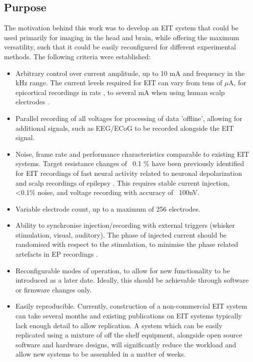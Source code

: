 \subsection{Purpose}

The motivation behind this work was to develop an EIT system that could be used primarily for imaging in the head and brain, while offering the maximum versatility, such that it could be easily reconfigured for different experimental methods. The following criteria were established:


\begin{itemize}
\item Arbitrary control over current amplitude, up to 10 mA and frequency in the kHz range. The current levels required for EIT can vary from tens of $\mu$A, for epicortical recordings in rats \cite{Oh2011}, to several mA when using human scalp electrodes \cite{tidswell2001three}.
\item Parallel recording of all voltages for processing of data 'offline', allowing for additional signals, such as EEG/ECoG to be recorded alongside the EIT signal.
\item Noise, frame rate and performance characteristics comparable to existing EIT systems. Target resistance changes of ~0.1 \% have been previously identified for EIT recordings of fast neural activity related to neuronal depolarization and scalp recordings of epilepsy \cite{Oh2011,Fabrizi_2006}. This requires stable current injection, <0.1\% noise, and voltage recording with accuracy of ~100nV.
\item Variable electrode count, up to a maximum of 256 electrodes.
\item Ability to synchronise injection/recording with external triggers (whisker stimulation, visual, auditory). The phase of injected current should be randomised with respect to the stimulation, to minimise the phase related artefacts in EP recordings \cite{Aristovich_2015}.
\item Reconfigurable modes of operation, to allow for new functionality to be introduced as a later date. Ideally, this should be achievable  through software or firmware changes only.
\item Easily reproducible. Currently, construction of a non-commercial EIT system can take several months and existing publications on EIT systems typically lack enough detail to allow replication. A system which can be easily replicated using a mixture of off the shelf equipment, alongside open source software and hardware designs, will significantly reduce the workload and allow new systems to be assembled in a matter of weeks.
\end{itemize}

